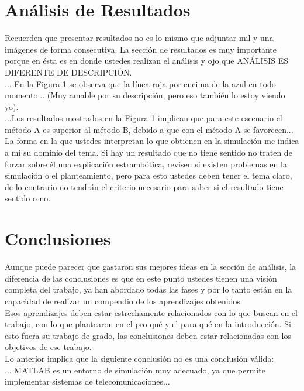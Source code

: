 \documentclass[12pt]{article}
\begin{document}
\section*{Análisis de Resultados}
    Recuerden que presentar resultados no es lo mismo que adjuntar mil y una imágenes de 
    forma consecutiva. La sección de resultados es muy importante porque en ésta es en 
    donde ustedes realizan el análisis y ojo que ANÁLISIS ES DIFERENTE DE DESCRIPCIÓN.\\
    ... En la Figura 1 se observa que la línea roja por encima de la azul en todo 
    momento... (Muy amable por su descripción, pero eso también lo estoy viendo yo).\\
    ...Los resultados mostrados en la Figura 1 implican que para este escenario el método A 
    es superior al método B, debido a que con el método A se favorecen...\\
    La forma en la que ustedes interpretan lo que obtienen en la simulación me indica a mí su 
    dominio del tema. Si hay un resultado que no tiene sentido no traten de forzar sobre él 
    una explicación estrambótica, revisen si existen problemas en la simulación o el 
    planteamiento, pero para esto ustedes deben tener el tema claro, de lo contrario no 
    tendrán el criterio necesario para saber si el resultado tiene sentido o no.
    
\section*{Conclusiones}
    Aunque puede parecer que gastaron sus mejores ideas en la sección de análisis, la 
    diferencia de las conclusiones es que en este punto ustedes tienen una visión completa 
    del trabajo, ya han abordado todas las fases y por lo tanto están en la capacidad de 
    realizar un compendio de los aprendizajes obtenidos.\\
    Esos aprendizajes deben estar estrechamente relacionados con lo que buscan en el 
    trabajo, con lo que plantearon en el pro qué y el para qué en la introducción. Si esto fuera 
    su trabajo de grado, las conclusiones deben estar relacionadas con los objetivos de ese 
    trabajo.\\
    Lo anterior implica que la siguiente conclusión no es una conclusión válida:\\
    ... MATLAB es un entorno de simulación muy adecuado, ya que permite implementar 
    sistemas de telecomunicaciones...
    
\end{document}
